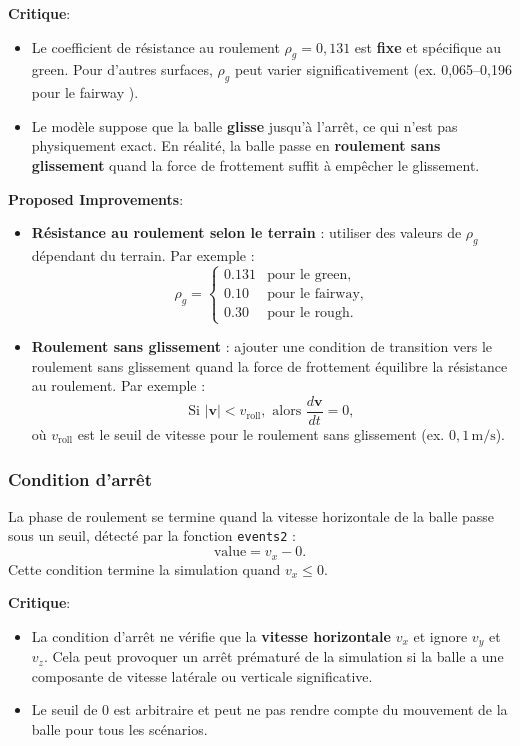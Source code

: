 \documentclass[10pt,a4paper]{report}
\begin{document}
\textbf{Critique}:
\begin{itemize}
    \item Le coefficient de résistance au roulement $\rho_g = 0{,}131$ est \textbf{fixe} et spécifique au green. Pour d'autres surfaces, $\rho_g$ peut varier significativement (ex. 0,065--0,196 pour le fairway \cite{PA07}).
    \item Le modèle suppose que la balle \textbf{glisse} jusqu'à l'arrêt, ce qui n'est pas physiquement exact. En réalité, la balle passe en \textbf{roulement sans glissement} quand la force de frottement suffit à empêcher le glissement.
\end{itemize}

\textbf{Proposed Improvements}:
\begin{itemize}
    \item \textbf{Résistance au roulement selon le terrain} : utiliser des valeurs de $\rho_g$ dépendant du terrain. Par exemple :
    \[
    \rho_g =
    \begin{cases}
    0.131 & \text{pour le green}, \\
    0.10 & \text{pour le fairway}, \\
    0.30 & \text{pour le rough}.
    \end{cases}
    \]
    \item \textbf{Roulement sans glissement} : ajouter une condition de transition vers le roulement sans glissement quand la force de frottement équilibre la résistance au roulement. Par exemple :
    \[
    \text{Si } |\mathbf{v}| < v_{\text{roll}}, \text{ alors } \frac{d\mathbf{v}}{dt} = 0,
    \]
    où $v_{\text{roll}}$ est le seuil de vitesse pour le roulement sans glissement (ex. $0{,}1 \, \text{m/s}$).
\end{itemize}


\subsubsection{Condition d'arrêt}
\label{subsubsec:stopping_condition}

La phase de roulement se termine quand la vitesse horizontale de la balle passe sous un seuil, détecté par la fonction \texttt{events2} :
\[
\text{value} = v_x - 0.
\]
Cette condition termine la simulation quand $v_x \leq 0$.

\textbf{Critique}:
\begin{itemize}
    \item La condition d'arrêt ne vérifie que la \textbf{vitesse horizontale} $v_x$ et ignore $v_y$ et $v_z$. Cela peut provoquer un arrêt prématuré de la simulation si la balle a une composante de vitesse latérale ou verticale significative.
    \item Le seuil de $0$ est arbitraire et peut ne pas rendre compte du mouvement de la balle pour tous les scénarios.
\end{itemize}
\end{document}
